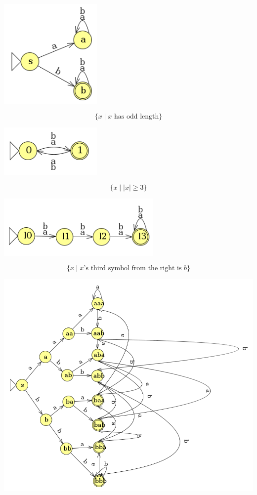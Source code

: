 \documentclass[letterpaper, 12pt]{math}
\begin{document}
\begin{enumerate}
\begin{enumerate}
    \begin{center}
      \includegraphics[width=5cm]{hw_3_5.png}
    \end{center}
    \[ \{x\mid x\text{ has odd length}\} \]
    \begin{center}
      \includegraphics[width=5cm]{hw_3_6.png}
    \end{center}
    \[ \{x\mid|x|\geq3\} \]
    \begin{center}
      \includegraphics[width=8cm]{hw_3_7.png}
    \end{center}
    \[ \{x\mid x\text{'s third symbol from the right is } b\} \]
    \begin{center}
      \includegraphics[width=16cm]{hw_3_8.png}

\end{center}
\end{enumerate}
\end{enumerate}
\end{document}
